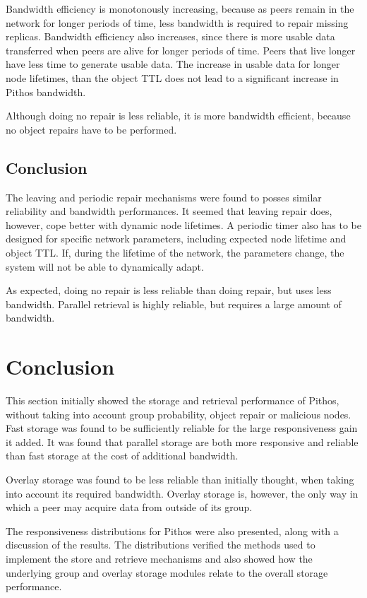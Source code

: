 Bandwidth efficiency is monotonously increasing, because as peers remain in the network for longer periods of time, less bandwidth is required to repair missing replicas. Bandwidth efficiency also increases, since there is more usable data transferred when peers are alive for longer periods of time. Peers that live longer have less time to generate usable data. The increase in usable data for longer node lifetimes, than the object TTL does not lead to a significant increase in Pithos bandwidth.

Although doing no repair is less reliable, it is more bandwidth efficient, because no object repairs have to be performed.

\subsection{Conclusion}

The leaving and periodic repair mechanisms were found to posses similar reliability and bandwidth performances. It seemed that leaving repair does, however, cope better with dynamic node lifetimes. A periodic timer also has to be designed for specific network parameters, including expected node lifetime and object TTL. If, during the lifetime of the network, the parameters change, the system will not be able to dynamically adapt.

As expected, doing no repair is less reliable than doing repair, but uses less bandwidth. Parallel retrieval is highly reliable, but requires a large amount of bandwidth.

\section{Conclusion}

This section initially showed the storage and retrieval performance of Pithos, without taking into account group probability, object repair or malicious nodes. Fast storage was found to be sufficiently reliable for the large responsiveness gain it added. It was found that parallel storage are both more responsive and reliable than fast storage at the cost of additional bandwidth.

Overlay storage was found to be less reliable than initially thought, when taking into account its required bandwidth. Overlay storage is, however, the only way in which a peer may acquire data from outside of its group.

The responsiveness distributions for Pithos were also presented, along with a discussion of the results. The distributions verified the methods used to implement the store and retrieve mechanisms and also showed how the underlying group and overlay storage modules relate to the overall storage performance.

